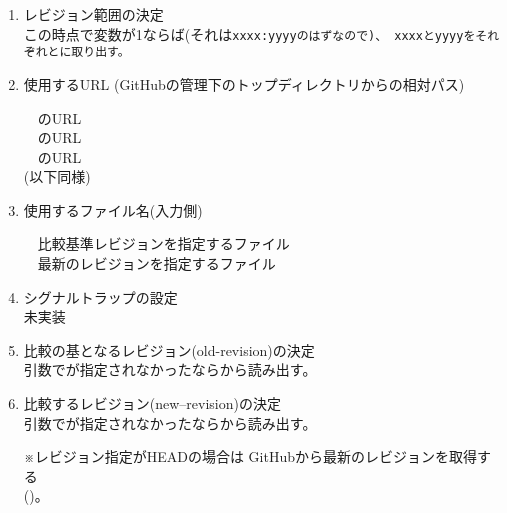\begin{enumerate}
  \item	レビジョン範囲の決定\\
	この時点で変数が1ならば(それは\tt{xxxx:yyyy}のはずなので)、
	\tt{xxxx}と\tt{yyyy}をそれぞれとに取り出す。

  \item	使用するURL
	(GitHubの管理下のトップディレクトリからの相対パス)
	\begin{narrow}[\WID]
		　のURL\\
		　のURL\\
		　のURL\\
		{\small (以下同様)}
	\end{narrow}

  \item	使用するファイル名(入力側)
	\begin{narrow}[\WID]
		　比較基準レビジョンを指定するファイル\\
		　最新のレビジョンを指定するファイル
	\end{narrow}

  \item	シグナルトラップの設定\\
	未実装

  \item	比較の基となるレビジョン(old-revision)の決定\\
	引数でが指定されなかったならから読み出す。

  \item	比較するレビジョン(new--revision)の決定\\
	引数でが指定されなかったならから読み出す。\\
	\vspace{.3\baselineskip}
	\begin{minipage}[t]{\linewidth}
		\small{※\Hskip{5pt}レビジョン指定がHEADの場合は
			GitHubから最新のレビジョンを取得する}\\
		{\small \phantom{※}\Hskip{5pt}()。}\\
		\begin{LocalScope}
		\addtolength{\linewidth}{-20pt}
		\Hskip{20pt}
		\end{LocalScope}
	\end{minipage}


\end{enumerate}
